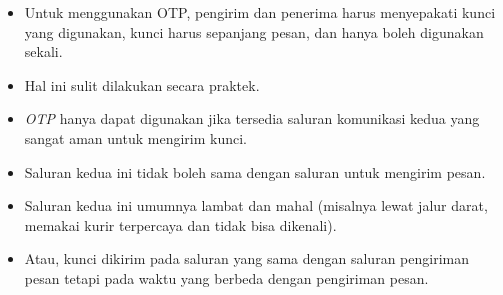 \documentclass{article}
\begin{document}

\begin{itemize}
  \item Untuk menggunakan OTP, pengirim dan penerima harus menyepakati kunci yang digunakan, kunci harus sepanjang pesan, dan hanya boleh digunakan sekali.
  \item Hal ini sulit dilakukan secara praktek.
  \item \textit{OTP} hanya dapat digunakan jika tersedia saluran komunikasi kedua yang sangat aman untuk mengirim kunci.
  \item Saluran kedua ini tidak boleh sama dengan saluran untuk mengirim pesan.
  \item Saluran kedua ini umumnya lambat dan mahal (misalnya lewat jalur darat, memakai kurir terpercaya dan tidak bisa dikenali).
  \item Atau, kunci dikirim pada saluran yang sama dengan saluran pengiriman pesan tetapi pada waktu yang berbeda dengan pengiriman pesan.
\end{itemize}
\end{document}
